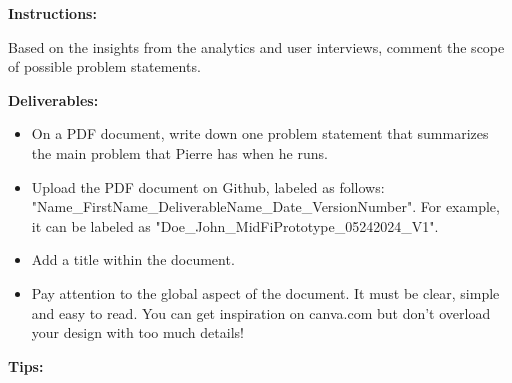 \makeheaderfiles

\textbf{Instructions:}

Based on the insights from the analytics and user interviews, comment the scope of possible problem statements.

\textbf{Deliverables:}

\begin{itemize}
\item On a PDF document, write down one problem statement that summarizes the main problem that Pierre has when he runs.
\item Upload the PDF document on Github, labeled as follows: "Name\_FirstName\_DeliverableName\_Date\_VersionNumber". For example, it can be labeled as "Doe\_John\_MidFiPrototype\_05242024\_V1".
\item Add a title within the document.
\item Pay attention to the global aspect of the document. It must be clear, simple and easy to read. You can get inspiration on canva.com but don't overload your design with too much details!
\end{itemize}

\textbf{Tips:}


